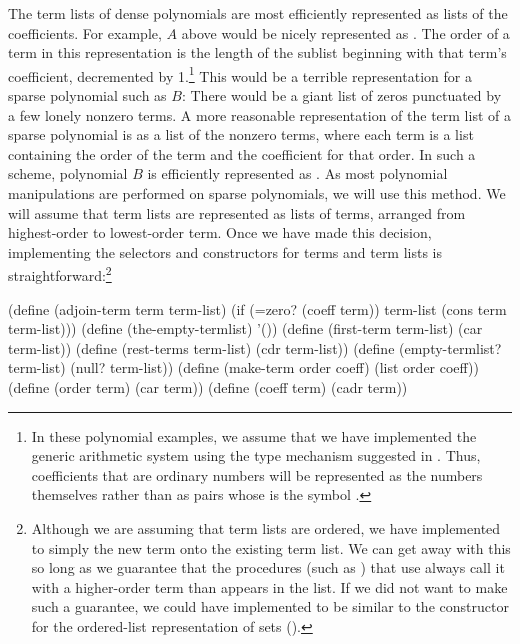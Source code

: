 The term lists of dense polynomials are most efficiently represented as lists
of the coefficients.  For example, \( A \) above would be nicely represented as
.  The order of a term in this representation is the
length of the sublist beginning with that term's coefficient, decremented by
1.\footnote{In these polynomial examples, we assume that we have implemented
the generic arithmetic system using the type mechanism suggested in
.  Thus, coefficients that are ordinary numbers will be
represented as the numbers themselves rather than as pairs whose  is
the symbol .}  This would be a terrible representation for
a sparse polynomial such as \( B \): There would be a giant list of zeros
punctuated by a few lonely nonzero terms.  A more reasonable representation of
the term list of a sparse polynomial is as a list of the nonzero terms, where
each term is a list containing the order of the term and the coefficient for
that order.  In such a scheme, polynomial \( B \) is efficiently represented as
.  As most polynomial manipulations are performed
on sparse polynomials, we will use this method.  We will assume that term lists
are represented as lists of terms, arranged from highest-order to lowest-order
term.  Once we have made this decision, implementing the selectors and
constructors for terms and term lists is straightforward:\footnote{Although we
are assuming that term lists are ordered, we have implemented
 to simply  the new term onto the existing term
list.  We can get away with this so long as we guarantee that the procedures
(such as ) that use  always call it with a
higher-order term than appears in the list.  If we did not want to make such a
guarantee, we could have implemented  to be similar to the
 constructor for the ordered-list representation of sets
().}

\begin{codeBlock}
(define (adjoin-term term term-list)
  (if (=zero? (coeff term))
      term-list
      (cons term term-list)))
(define (the-empty-termlist) '())
(define (first-term term-list) (car term-list))
(define (rest-terms term-list) (cdr term-list))
(define (empty-termlist? term-list) (null? term-list))
(define (make-term order coeff) (list order coeff))
(define (order term) (car term))
(define (coeff term) (cadr term))
\end{codeBlock}

